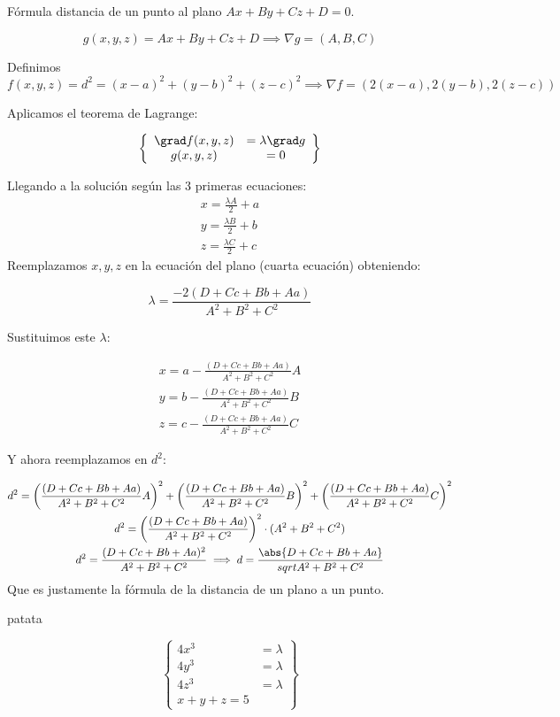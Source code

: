 \documentclass{apuntes}
\begin{document}
\begin{problem}[18]
Fórmula distancia de un punto al plano $Ax+By+Cz+D=0$.

\solution
\[g(x,y,z) = Ax+By+Cz+D \implies \nabla g = (A,B,C)\]

Definimos 
\[f(x,y,z) = d^2 = (x-a)^2 + (y-b)^2 + (z-c)^2 \implies \nabla f = (2(x-a),2(y-b),2(z-c))\]

Aplicamos el teorema de Lagrange:

\[\left\{\begin{array}{cc}
\grad f(x,y,z) &= \lambda \grad g\\
g(x,y,z)&=0
\end{array}\right\}\]

Llegando a la solución según las 3 primeras ecuaciones:
\begin{gather*}
x=\frac{\lambda A}{2} +a\\
y = \frac{\lambda B}{2} +b\\
z = \frac{\lambda C}{2} +c
\end{gather*}
Reemplazamos $x,y,z$ en la ecuación del plano (cuarta ecuación) obteniendo:

\[\lambda = \frac{-2(D+Cc+Bb+Aa)}{A^2+B^2+C^2}\]

Sustituimos este $\lambda$:

\begin{gather*}
x=a-\frac{(D+Cc+Bb+Aa)}{A^2+B^2+C^2} A \\
y = b- \frac{(D+Cc+Bb+Aa)}{A^2+B^2+C^2} B\\
z = c - \frac{(D+Cc+Bb+Aa)}{A^2+B^2+C^2} C
\end{gather*}

Y ahora reemplazamos en $d^2$:

\begin{gather*}
d^2 = \left(\frac{(D+Cc+Bb+Aa)}{A^2+B^2+C^2} A\right)^2 + \left(\frac{(D+Cc+Bb+Aa)}{A^2+B^2+C^2} B\right)^2 + \left(\frac{(D+Cc+Bb+Aa)}{A^2+B^2+C^2} C\right)^2\\
d^2 = \left(\frac{(D+Cc+Bb+Aa)}{A^2+B^2+C^2}\right)^2 \cdot (A^2+B^2+C^2) \\
d^2 = \frac{(D+Cc+Bb+Aa)^2}{A^2+B^2+C^2} \implies d=\frac{\abs{D+Cc+Bb+Aa}}{sqrt{A^2+B^2+C^2}}
\end{gather*}
Que es justamente la fórmula de la distancia de un plano a un punto.

\end{problem}


\begin{problem}[19]
patata
\solution

\[\left\{
\begin{array}{cc}
4x^3&=\lambda\\
4y^3&=\lambda\\
4z^3&=\lambda\\
x+y+z=5
\end{array}\right\}\]
\end{problem}
\end{document}
